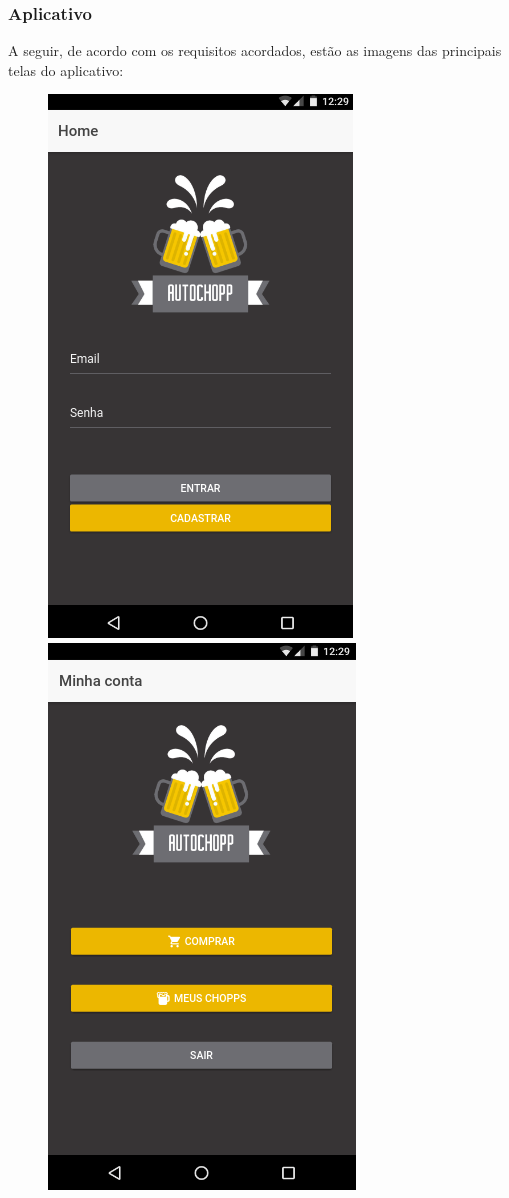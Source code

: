 \subsubsection{Aplicativo}

A seguir, de acordo com os requisitos acordados, estão as imagens das principais telas do aplicativo:

\begin{figure}[!htb]
    \centering
    \includegraphics[scale= 0.3]{figuras/Aplicativo/home.png}
    \includegraphics[scale= 0.3]{figuras/Aplicativo/home-loged.png}       

\end{figure}
